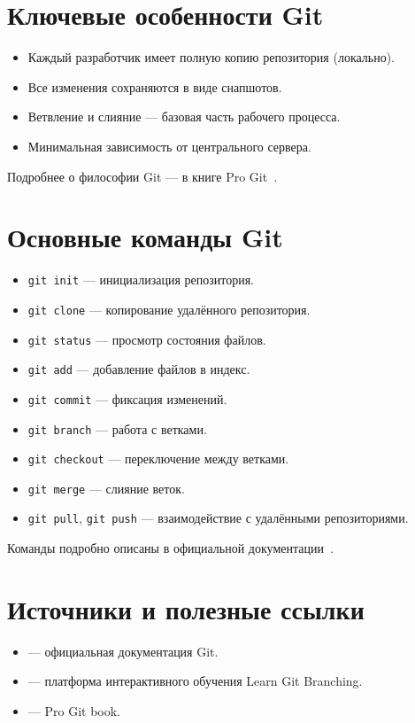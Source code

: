 \documentclass[a4paper,12pt]{report}
\begin{document}
\section{Ключевые особенности Git}
\begin{itemize}[noitemsep]
    \item Каждый разработчик имеет полную копию репозитория (локально).
    \item Все изменения сохраняются в виде снапшотов.
    \item Ветвление и слияние — базовая часть рабочего процесса.
    \item Минимальная зависимость от центрального сервера.
\end{itemize}

Подробнее о философии Git — в книге Pro Git~\cite{progit_book}.

\section{Основные команды Git}
\begin{itemize}[noitemsep]
    \item \texttt{git init} — инициализация репозитория.
    \item \texttt{git clone} — копирование удалённого репозитория.
    \item \texttt{git status} — просмотр состояния файлов.
    \item \texttt{git add} — добавление файлов в индекс.
    \item \texttt{git commit} — фиксация изменений.
    \item \texttt{git branch} — работа с ветками.
    \item \texttt{git checkout} — переключение между ветками.
    \item \texttt{git merge} — слияние веток.
    \item \texttt{git pull}, \texttt{git push} — взаимодействие с удалёнными репозиториями.
\end{itemize}

Команды подробно описаны в официальной документации~\cite{git_official_doc}.

\section{Источники и полезные ссылки}
\begin{itemize}[noitemsep]
    \item \cite{git_official_doc} — официальная документация Git.
    \item \cite{learngitbranching} — платформа интерактивного обучения Learn Git Branching.
    \item \cite{progit_book} — Pro Git book.
\end{itemize}
\end{document}

